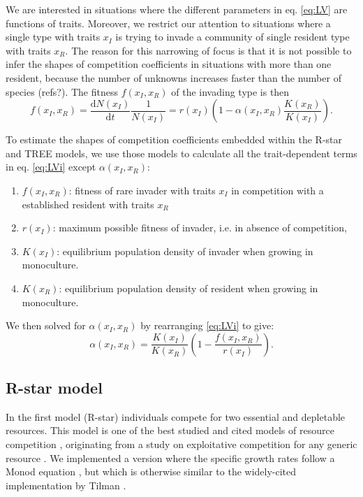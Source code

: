 \documentclass[a4paper,11pt]{article}
\newcommand{\ud}{\ensuremath{\mathrm{d}}}
\begin{document}
\begin{itemize}
We are interested in situations where the different parameters in eq.
\ref{eq:LV} are functions  of traits. Moreover, we restrict our
attention to situations where a single type with traits
$x_I$ is trying to invade a community of single resident type with traits
$x_R$. The reason for this narrowing of focus is that it is not possible to
infer the shapes of competition coefficients in situations with more than one
resident, because the number of unknowns increases faster than the number of
species (refs?).  The fitness $f(x_I, x_R)$ of the invading type is
then
\begin{equation}
  \label{eq:LVi}
   f(x_I, x_R) = \frac{\ud N(x_I)}{\ud t} \frac{1}{N(x_I)} =
    r(x_I)\left(1 - \alpha(x_I, x_R) \frac{K(x_R)}{K(x_I)}\right).
\end{equation}

To estimate the shapes of competition coefficients embedded within the R-star
and TREE models, we use those models to calculate all the trait-dependent
terms in eq. \ref{eq:LVi} except $\alpha(x_I, x_R)$:
\begin{enumerate}
  \item $f(x_I, x_R)$: fitness of rare invader with traits $x_I$  in competition
  with a established resident with traits $x_R$
  \item $r(x_I)$: maximum possible fitness of invader, i.e. in absence of competition,
  \item $K(x_I)$: equilibrium population density of invader when growing in monoculture.
  \item $K(x_R)$: equilibrium population density of resident when growing in
  monoculture.
\end{enumerate}
We then solved for $\alpha(x_I, x_R)$ by rearranging  \ref{eq:LVi} to give:
\begin{equation}
  \label{eq:alpha}
 \alpha(x_I, x_R) = \frac{K(x_I)}{K(x_R)}
  \left(1 - \frac{f(x_I, x_R)}{r(x_I)}\right).
\end{equation}

\subsection{R-star model}

In the first model (R-star) individuals compete for two essential and
depletable resources. This model is one of the best studied and cited models
of resource competition \citep{Tilman-1977, Tilman-1982, Huisman-1999},
originating from a study on exploitative competition for any generic resource
\citet{Leon-1975}. We implemented a version where the specific growth rates
follow a Monod equation \citet{Huisman-1999}, but which is otherwise similar
to the widely-cited implementation by Tilman \citep{Tilman-1977, Tilman-1982}.


\end{itemize}
\end{document}
